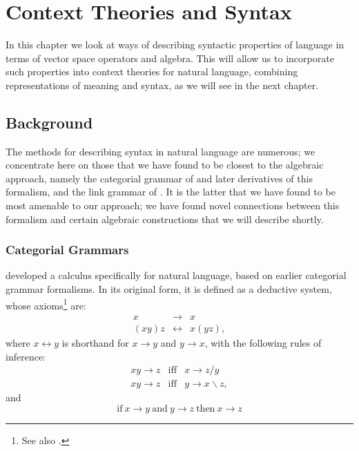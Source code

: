 \documentclass[12pt]{report}
\begin{document}
                

\chapter{Context Theories and Syntax} 

In this chapter we look at ways of describing syntactic properties of language in terms of vector space operators and algebra. This will allow us to incorporate such properties into context theories for natural language, combining representations of meaning and syntax, as we will see in the next chapter.

\section{Background}

The methods for describing syntax in natural language are numerous; we concentrate here on those that we have found to be closest to the algebraic approach, namely the categorial grammar of \cite{Lambek:58} and later derivatives of this formalism, and the link grammar of \cite{Sleator:91}. It is the latter that we have found to be most amenable to our approach; we have found novel connections between this formalism and certain algebraic constructions that we will describe shortly.

\subsection{Categorial Grammars}


\cite{Lambek:58} developed a calculus specifically for natural language, based on earlier categorial grammar formalisms. In its original form, it is defined as a deductive system, whose axioms\footnote{See also \cite{Wood:93}.} are:
\begin{eqnarray*}
x & \rightarrow & x\\
(xy)z & \leftrightarrow  & x(yz),
\end{eqnarray*}
where $x \leftrightarrow y$ is shorthand for $x\rightarrow y$ and $y\rightarrow x$, with the following rules of inference:
\begin{eqnarray*}
xy \rightarrow z & \mathrm{iff} & x\rightarrow z/y\\
xy \rightarrow z & \mathrm{iff} & y\rightarrow x\backslash z,
\end{eqnarray*}
and
$$\mathrm{if}\ x\rightarrow y\ \mathrm{and}\  y\rightarrow z\ \mathrm{then}\ x\rightarrow z$$
\end{document}
